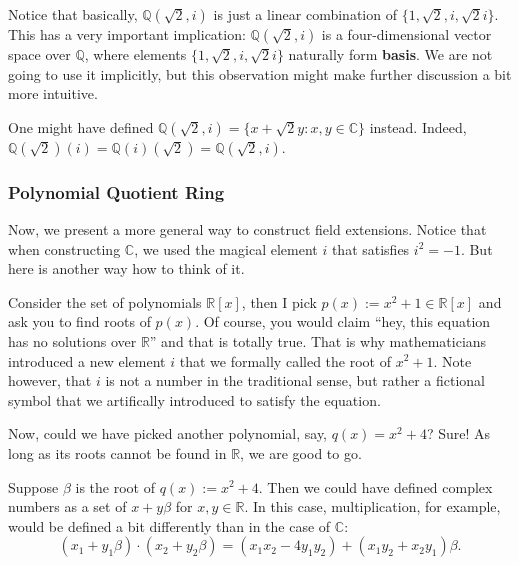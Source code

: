 \documentclass[../lecture-notes.tex]{subfiles}
\begin{document}
\begin{remark}
    Notice that basically, $\mathbb{Q}(\sqrt{2}, i)$ is just a linear combination of $\{1,\sqrt{2},i,\sqrt{2}i\}$. This has a very important implication: $\mathbb{Q}(\sqrt{2}, i)$ is a four-dimensional vector space over $\mathbb{Q}$, where elements $\{1,\sqrt{2},i,\sqrt{2}i\}$ naturally form \textbf{basis}. We are not going to use it implicitly, but this observation might make further discussion a bit more intuitive.
\end{remark}

\begin{remark}
    One might have defined $\mathbb{Q}(\sqrt{2}, i) = \{x+\sqrt{2}y: x,y \in \mathbb{C}\}$ instead. Indeed, $\mathbb{Q}(\sqrt{2})(i) = \mathbb{Q}(i)(\sqrt{2}) = \mathbb{Q}(\sqrt{2}, i)$.
\end{remark}

\subsubsection{Polynomial Quotient Ring}

Now, we present a more general way to construct field extensions. Notice that when constructing $\mathbb{C}$, we used the magical element $i$ that satisfies $i^2=-1$. But here is another way how to think of it.

Consider the set of polynomials $\mathbb{R}[x]$, then I pick $p(x):=x^2+1 \in \mathbb{R}[x]$ and ask you to find roots of $p(x)$. Of course, you would claim ``hey, this equation has no solutions over $\mathbb{R}$'' and that is totally true. That is why mathematicians introduced a new element $i$ that we formally called the root of $x^2+1$. Note however, that $i$ is not a number in the traditional sense, but rather a fictional symbol that we artifically introduced to satisfy the equation.

Now, could we have picked another polynomial, say, $q(x) = x^2+4$? Sure! As long as its roots cannot be found in $\mathbb{R}$, we are good to go.

\begin{example}
    Suppose $\beta$ is the root of $q(x):=x^2+4$. Then we could have defined complex numbers as a set of $x+y\beta$ for $x,y \in \mathbb{R}$. In this case, multiplication, for example, would be defined a bit differently than in the case of $\mathbb{C}$:
    \begin{equation}
        (x_1+y_1\beta) \cdot (x_2+y_2\beta) = (x_1x_2-4y_1y_2) + (x_1y_2+x_2y_1)\beta.
    \end{equation}
\end{example}
\end{document}
